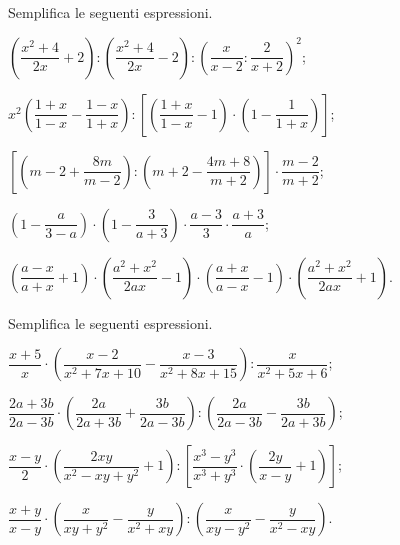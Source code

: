\begin{esercizio}[\Ast]
\label{ese:14.60}
Semplifica le seguenti espressioni.
\begin{enumeratea}
 \item $\left(\dfrac{x^{2}+4}{2x}+2\right):\left(\dfrac{x^{2}+4}{2x}-2\right):\left(\dfrac{x}{x-2}:\dfrac{2}{x+2}\right)^{2}$;
 \item $x^{2}\left(\dfrac{1+x}{1-x}-\dfrac{1-x}{1+x}\right):\left[\left(\dfrac{1+x}{1-x}-1\right)\cdot\left(1-\dfrac{1}{1+x}\right)\right]$;
 \item $\left[\left(m-2+\dfrac{8m}{m-2}\right):\left(m+2-\dfrac{4m+8}{m+2}\right)\right]\cdot \dfrac{m-2}{m+2}$;
 \item $\left(1-\dfrac{a}{3-a}\right)\cdot\left(1-\dfrac{3}{a+3}\right)\cdot\dfrac{a-3}{3}\cdot\dfrac{a+3}{a}$;
 \item $\left(\dfrac{a-x}{a+x}+1\right)\cdot\left(\dfrac{a^{2}+x^{2}}{2ax}-1\right)\cdot\left(\dfrac{a+x}{a-x}-1\right)\cdot\left(\dfrac{a^{2}+x^{2}}{2ax}+1\right)$.
\end{enumeratea}
\end{esercizio}

\begin{esercizio}[\Ast]
\label{ese:14.61}
Semplifica le seguenti espressioni.
\begin{enumeratea}
 \item $\dfrac{x+5}{x}\cdot\left(\dfrac{x-2}{x^{2}+7x+10}-\dfrac{x-3}{x^{2}+8x+15}\right):\dfrac{x}{x^{2}+5x+6}$;
 \item $\dfrac{2a+3b}{2a-3b}\cdot\left(\dfrac{2a}{2a+3b}+\dfrac{3b}{2a-3b}\right):\left(\dfrac{2a}{2a-3b}-\dfrac{3b}{2a+3b}\right)$;
 \item $\dfrac{x-y}{2}\cdot\left(\dfrac{2xy}{x^{2}-xy+y^{2}}+1\right):\left[\dfrac{x^{3}-y^{3}}{x^{3}+y^{3}}\cdot\left(\dfrac{2y}{x-y}+1\right)\right]$;
 \item $\dfrac{x+y}{x-y}\cdot\left(\dfrac{x}{xy+y^{2}}-\dfrac{y}{x^{2}+xy}\right):\left(\dfrac{x}{xy-y^{2}}-\dfrac{y}{x^{2}-xy}\right)$.
\end{enumeratea}
\end{esercizio}

